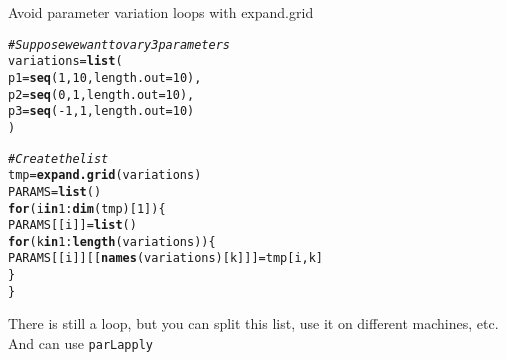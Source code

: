 \documentclass[aspectratio=169]{beamer}\usepackage[]{graphicx}\usepackage[]{xcolor}
\makeatletter
\newcommand{\hlnum}[1]{\textcolor[rgb]{0.686,0.059,0.569}{#1}}%
\newcommand{\hlcom}[1]{\textcolor[rgb]{0.678,0.584,0.686}{\textit{#1}}}%
\newcommand{\hlopt}[1]{\textcolor[rgb]{0,0,0}{#1}}%
\newcommand{\hldef}[1]{\textcolor[rgb]{0.345,0.345,0.345}{#1}}%
\newcommand{\hlkwa}[1]{\textcolor[rgb]{0.161,0.373,0.58}{\textbf{#1}}}%
\newcommand{\hlkwb}[1]{\textcolor[rgb]{0.69,0.353,0.396}{#1}}%
\newcommand{\hlkwc}[1]{\textcolor[rgb]{0.333,0.667,0.333}{#1}}%
\newcommand{\hlkwd}[1]{\textcolor[rgb]{0.737,0.353,0.396}{\textbf{#1}}}%
\newenvironment{kframe}{%
 \def\at@end@of@kframe{}%
 \ifinner\ifhmode%
  \def\at@end@of@kframe{\end{minipage}}%
  \begin{minipage}{\columnwidth}%
 \fi\fi%
 \def\FrameCommand##1{\hskip\@totalleftmargin \hskip-\fboxsep
 \colorbox{shadecolor}{##1}\hskip-\fboxsep
     \hskip-\linewidth \hskip-\@totalleftmargin \hskip\columnwidth}%
 \MakeFramed {\advance\hsize-\width
   \@totalleftmargin\z@ \linewidth\hsize
   \@setminipage}}%
 {\par\unskip\endMakeFramed%
 \at@end@of@kframe}
\newenvironment{knitrout}{}{} %
\makeatother
\begin{document}
\begin{frame}[fragile]{Avoid parameter variation loops with expand.grid}
\begin{knitrout}
\color{fgcolor}\begin{kframe}
\begin{alltt}
\hlcom{# Suppose we want to vary 3 parameters}
\hldef{variations} \hlkwb{=} \hlkwd{list}\hldef{(}
    \hlkwc{p1} \hldef{=} \hlkwd{seq}\hldef{(}\hlnum{1}\hldef{,} \hlnum{10}\hldef{,} \hlkwc{length.out} \hldef{=} \hlnum{10}\hldef{),}
    \hlkwc{p2} \hldef{=} \hlkwd{seq}\hldef{(}\hlnum{0}\hldef{,} \hlnum{1}\hldef{,} \hlkwc{length.out} \hldef{=} \hlnum{10}\hldef{),}
    \hlkwc{p3} \hldef{=} \hlkwd{seq}\hldef{(}\hlopt{-}\hlnum{1}\hldef{,} \hlnum{1}\hldef{,} \hlkwc{length.out} \hldef{=} \hlnum{10}\hldef{)}
\hldef{)}

\hlcom{# Create the list}
\hldef{tmp} \hlkwb{=} \hlkwd{expand.grid}\hldef{(variations)}
\hldef{PARAMS} \hlkwb{=} \hlkwd{list}\hldef{()}
\hlkwa{for} \hldef{(i} \hlkwa{in} \hlnum{1}\hlopt{:}\hlkwd{dim}\hldef{(tmp)[}\hlnum{1}\hldef{]) \{}
    \hldef{PARAMS[[i]]} \hlkwb{=} \hlkwd{list}\hldef{()}
    \hlkwa{for} \hldef{(k} \hlkwa{in} \hlnum{1}\hlopt{:}\hlkwd{length}\hldef{(variations)) \{}
        \hldef{PARAMS[[i]][[}\hlkwd{names}\hldef{(variations)[k]]]} \hlkwb{=} \hldef{tmp[i, k]}
    \hldef{\}}
\hldef{\}}
\end{alltt}
\end{kframe}
\end{knitrout}

There is still a loop, but you can split this list, use it on different machines, etc. And can use \texttt{parLapply}
\end{frame}



\end{document}
